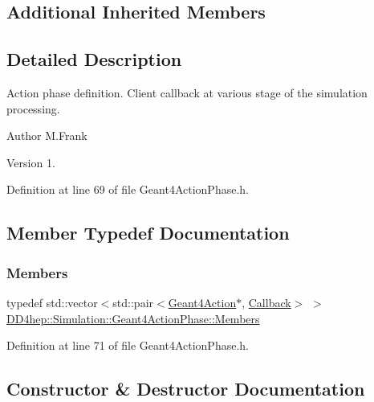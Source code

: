 \subsection*{Additional Inherited Members}


\subsection{Detailed Description}
Action phase definition. Client callback at various stage of the simulation processing. 

\begin{DoxyAuthor}{Author}
M.\+Frank 
\end{DoxyAuthor}
\begin{DoxyVersion}{Version}
1. 
\end{DoxyVersion}


Definition at line 69 of file Geant4\+Action\+Phase.\+h.



\subsection{Member Typedef Documentation}
\hypertarget{class_d_d4hep_1_1_simulation_1_1_geant4_action_phase_a4df9a501a5c2d810603cd58f5ff5157d}{}\label{class_d_d4hep_1_1_simulation_1_1_geant4_action_phase_a4df9a501a5c2d810603cd58f5ff5157d} 
\subsubsection{\texorpdfstring{Members}{Members}}
{\footnotesize\ttfamily typedef std\+::vector$<$std\+::pair$<$\hyperlink{class_d_d4hep_1_1_simulation_1_1_geant4_action}{Geant4\+Action}$\ast$, \hyperlink{class_d_d4hep_1_1_callback}{Callback}$>$ $>$ \hyperlink{class_d_d4hep_1_1_simulation_1_1_geant4_action_phase_a4df9a501a5c2d810603cd58f5ff5157d}{D\+D4hep\+::\+Simulation\+::\+Geant4\+Action\+Phase\+::\+Members}}



Definition at line 71 of file Geant4\+Action\+Phase.\+h.



\subsection{Constructor \& Destructor Documentation}
\hypertarget{class_d_d4hep_1_1_simulation_1_1_geant4_action_phase_a95448127c1419ea43e3902d1fe785dbe}{}\label{class_d_d4hep_1_1_simulation_1_1_geant4_action_phase_a95448127c1419ea43e3902d1fe785dbe} 
